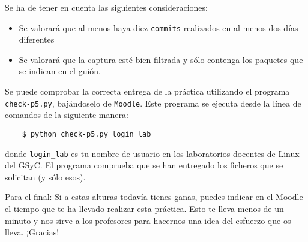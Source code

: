 \documentclass[11pt,a4paper]{article}
\begin{document}
Se ha de tener en cuenta las siguientes consideraciones:
\begin{itemize}
  \item Se valorará que al menos haya diez \texttt{commits} realizados en al menos dos días diferentes
  \item Se valorará que la captura esté bien filtrada y sólo contenga los paquetes que se indican en el guión.
\end{itemize}

Se puede comprobar la correcta entrega de la práctica utilizando el programa \texttt{check-p5.py}, bajándoselo de \texttt{Moodle}. Este programa se ejecuta desde la línea de comandos de la siguiente manera:
\begin{verbatim}
	$ python check-p5.py login_lab
\end{verbatim}


donde \texttt{login\_lab} es tu nombre de usuario en los laboratorios docentes de Linux del GSyC. El programa comprueba que se han entregado los ficheros que se solicitan (y sólo esos).


\vspace{1cm}

\footnotesize{Para el final: Si a estas alturas todavía tienes ganas, puedes indicar en el Moodle el tiempo que te ha llevado realizar esta práctica. Esto te lleva menos de un minuto y nos sirve a los profesores para hacernos una idea del esfuerzo que os lleva. ¡Gracias!}
\end{document}
